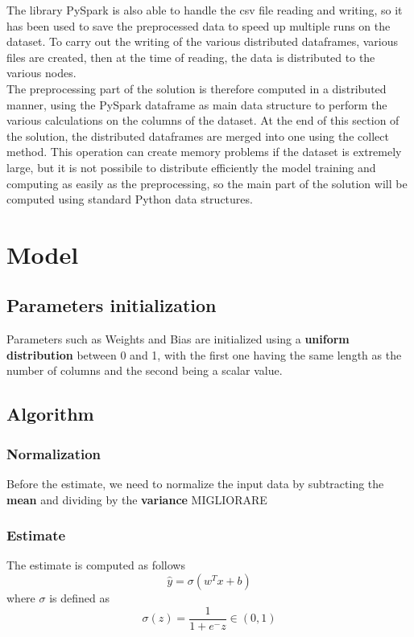 \documentclass[
	letterpaper, %
	10pt, %
]{class}
\begin{document}
The library PySpark is also able to handle the csv file reading and writing, so it has been used to save the preprocessed data to speed up multiple runs on the dataset. To carry out the writing of the various distributed dataframes, various files are created, then at the time of reading, the data is distributed to the various nodes.\\

The preprocessing part of the solution is therefore computed in a distributed manner, using the PySpark dataframe as main data structure to perform the various calculations on the columns of the dataset.
At the end of this section of the solution, the distributed dataframes are merged into one using the collect method. This operation can create memory problems if the dataset is extremely large, but it is not possibile to distribute efficiently the model training
and computing as easily as the preprocessing, so the main part of the solution will be computed using standard Python data structures.


\section{Model}

\subsection{Parameters initialization}
Parameters such as Weights and Bias are initialized using a \textbf{uniform distribution} between 0 and 1, with the first one having the same length as the number of columns and the second being a scalar value.

\subsection{Algorithm}

\subsubsection{Normalization}
Before the estimate, we need to normalize the input data by subtracting the \textbf{mean} and dividing by the \textbf{variance}
MIGLIORARE

\subsubsection{Estimate}
The estimate is computed as follows
$$ \hat{y} = \sigma(w^Tx + b) $$
where $\sigma$ is defined as
$$ \sigma(z) = \frac{1}{1 + e^-z} \in (0,1) $$
\end{document}
